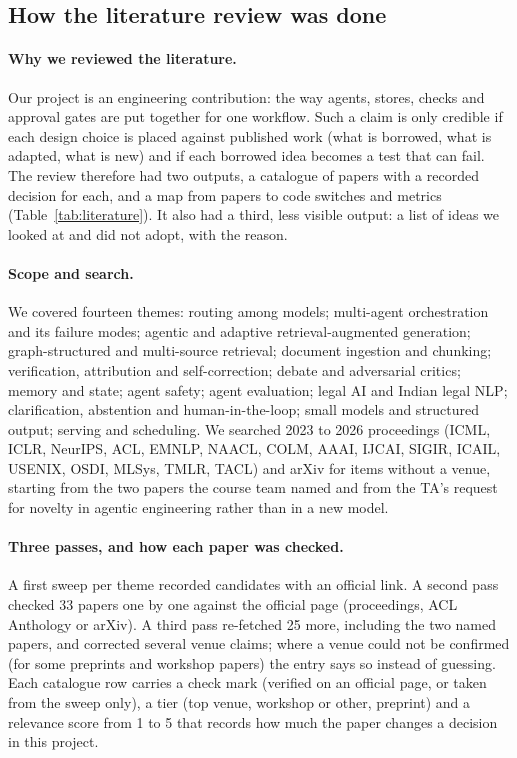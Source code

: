 \subsection{How the literature review was done}
\label{sec:litprocess}

\paragraph{Why we reviewed the literature.} Our project is an engineering contribution: the way agents, stores, checks and approval gates are put together for one workflow. Such a claim is only credible if each design choice is placed against published work (what is borrowed, what is adapted, what is new) and if each borrowed idea becomes a test that can fail. The review therefore had two outputs, a catalogue of papers with a recorded decision for each, and a map from papers to code switches and metrics (Table~\ref{tab:literature}). It also had a third, less visible output: a list of ideas we looked at and did not adopt, with the reason.

\paragraph{Scope and search.} We covered fourteen themes: routing among models; multi-agent orchestration and its failure modes; agentic and adaptive retrieval-augmented generation; graph-structured and multi-source retrieval; document ingestion and chunking; verification, attribution and self-correction; debate and adversarial critics; memory and state; agent safety; agent evaluation; legal AI and Indian legal NLP; clarification, abstention and human-in-the-loop; small models and structured output; serving and scheduling. We searched 2023 to 2026 proceedings (ICML, ICLR, NeurIPS, ACL, EMNLP, NAACL, COLM, AAAI, IJCAI, SIGIR, ICAIL, USENIX, OSDI, MLSys, TMLR, TACL) and arXiv for items without a venue, starting from the two papers the course team named and from the TA's request for novelty in agentic engineering rather than in a new model.

\paragraph{Three passes, and how each paper was checked.} A first sweep per theme recorded candidates with an official link. A second pass checked 33 papers one by one against the official page (proceedings, ACL Anthology or arXiv). A third pass re-fetched 25 more, including the two named papers, and corrected several venue claims; where a venue could not be confirmed (for some preprints and workshop papers) the entry says so instead of guessing. Each catalogue row carries a check mark (verified on an official page, or taken from the sweep only), a tier (top venue, workshop or other, preprint) and a relevance score from 1 to 5 that records how much the paper changes a decision in this project.


